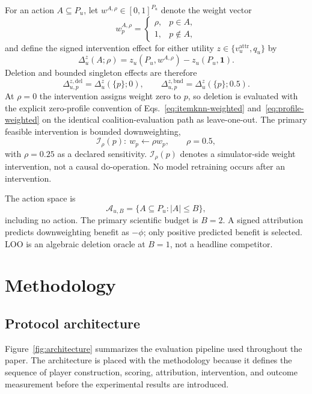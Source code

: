 \documentclass[a4paper,fleqn,doubleblind]{cas-sc}
\begin{document}
For an action $A\subseteq P_u$, let $w^{A,\rho}\in[0,1]^{P_u}$ denote the weight vector
\begin{equation}
w_p^{A,\rho}=\begin{cases}\rho,&p\in A,\\1,&p\notin A,\end{cases}
\end{equation}
and define the signed intervention effect for either utility $z\in\{v_u^{\mathrm{attr}},q_u\}$ by
\begin{equation}
\Delta_u^z(A;\rho)=z_u(P_u,w^{A,\rho})-z_u(P_u,\mathbf{1}).
\end{equation}
Deletion and bounded singleton effects are therefore
\begin{equation}
\Delta_{u,p}^{z,\mathrm{del}}=\Delta_u^z(\{p\};0),
\qquad
\Delta_{u,p}^{z,\mathrm{bnd}}=\Delta_u^z(\{p\};0.5).
\end{equation}
At $\rho=0$ the intervention assigns weight zero to $p$, so deletion is evaluated with the explicit zero-profile convention of Eqs.~\eqref{eq:itemknn-weighted} and~\eqref{eq:profile-weighted} on the identical coalition-evaluation path as leave-one-out. The primary feasible intervention is bounded downweighting,
\begin{equation}
\mathcal{I}_\rho(p):\ w_p\leftarrow\rho w_p,\qquad \rho=0.5,
\end{equation}
with $\rho=0.25$ as a declared sensitivity. $\mathcal{I}_\rho(p)$ denotes a simulator-side weight intervention, not a causal do-operation. No model retraining occurs after an intervention.

The action space is
\begin{equation}
\mathcal A_{u,B}=\{A\subseteq P_u:|A|\le B\},
\end{equation}
including no action. The primary scientific budget is $B=2$. A signed attribution predicts downweighting benefit as $-\phi$; only positive predicted benefit is selected. LOO is an algebraic deletion oracle at $B=1$, not a headline competitor.

\section{Methodology}
\subsection{Protocol architecture}
Figure~\ref{fig:architecture} summarizes the evaluation pipeline used throughout the paper. The architecture is placed with the methodology because it defines the sequence of player construction, scoring, attribution, intervention, and outcome measurement before the experimental results are introduced.
\end{document}
